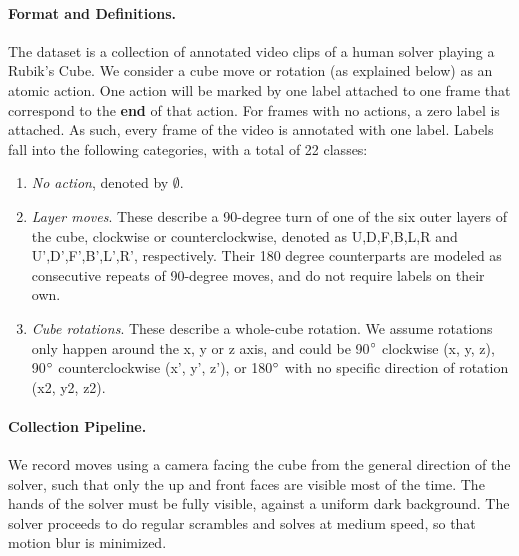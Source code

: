 \documentclass[10pt,twocolumn,letterpaper]{article}
\begin{document}
\paragraph{Format and Definitions.} 
The dataset is a collection of annotated video clips of a human solver playing a Rubik's Cube. We consider a cube move or rotation (as explained below) as an atomic action. One action will be marked by one label attached to one frame that correspond to the \textbf{end} of that action. For frames with no actions, a zero label is attached. As such, every frame of the video is annotated with one label. Labels fall into the following categories, with a total of 22 classes:
\begin{enumerate}
    \itemsep 0em
    \item \textit{No action}, denoted by $\emptyset$.
    \item \textit{Layer moves}. These describe a 90-degree turn of one of the six outer layers of the cube, clockwise or counterclockwise, denoted as U,D,F,B,L,R and U',D',F',B',L',R', respectively. Their 180 degree counterparts are modeled as consecutive repeats of 90-degree moves, and do not require labels on their own.
    \item \textit{Cube rotations}. These describe a whole-cube rotation. We assume rotations only happen around the x, y or z axis, and could be 90$\degree$ clockwise (x, y, z), 90$\degree$ counterclockwise (x', y', z'), or 180$\degree$ with no specific direction of rotation (x2, y2, z2). 
\end{enumerate}

\paragraph{Collection Pipeline.}
We record moves using a camera facing the cube from the general direction of the solver, such that only the up and front faces are visible most of the time. The hands of the solver must be fully visible, against a uniform dark background. The solver proceeds to do regular scrambles and solves at medium speed, so that motion blur is minimized. 

\end{document}

